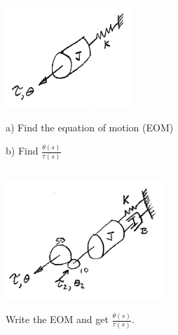 \documentclass{article}	%
\begin{document}
\subsection{}

\includegraphics[width=48mm]{00460a.png}

a) Find the equation of motion (EOM)

%

b) Find $\frac{\theta(s)}{\tau(s)}$\label{simplerotary}

%


\subsection{}

\includegraphics[width=60mm]{00461a.png}

Write the EOM and get $\frac{\theta(s)}{\tau(s)}$.

%
%
%
%
\end{document}
